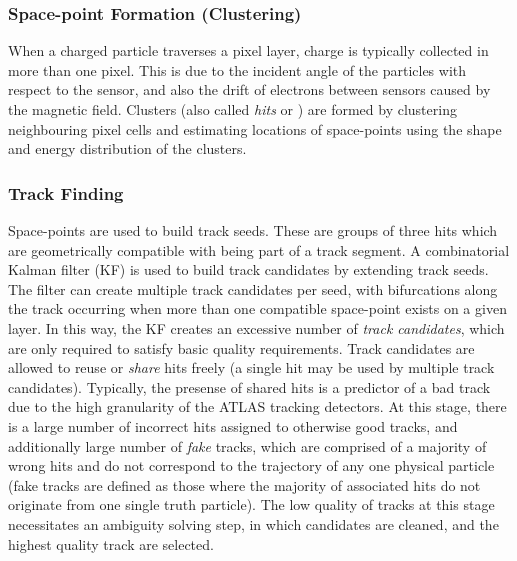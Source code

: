 
\subsubsection{Space-point Formation (Clustering)}
When a charged particle traverses a pixel layer, charge is typically collected in more than one pixel. 
This is due to the incident angle of the particles with respect to the sensor, and also the drift of electrons between sensors caused by the magnetic field.
Clusters (also called \textit{hits} or ) are formed by clustering neighbouring pixel cells and estimating locations of space-points using the shape and energy distribution of the clusters.

\subsubsection{Track Finding}
Space-points are used to build track seeds. These are groups of three hits which are geometrically compatible with being part of a track segment.
A combinatorial Kalman filter (KF) is used to build track candidates by extending track seeds.
The filter can create multiple track candidates per seed, with bifurcations along the track occurring when more than one compatible space-point exists on a given layer.
In this way, the KF creates an excessive number of \textit{track candidates}, which are only required to satisfy basic quality requirements. 
Track candidates are allowed to reuse or \textit{share} hits freely (a single hit may be used by multiple track candidates).
Typically, the presense of shared hits is a predictor of a bad track due to the high granularity of the ATLAS tracking detectors.
At this stage, there is a large number of incorrect hits assigned to otherwise good tracks, and additionally large number of \textit{fake} tracks, which are comprised of a majority of wrong hits and do not correspond to the trajectory of any one physical particle (fake tracks are defined as those where the majority of associated hits do not originate from one single truth particle).
The low quality of tracks at this stage necessitates an ambiguity solving step, in which candidates are cleaned, and the highest quality track are selected.

